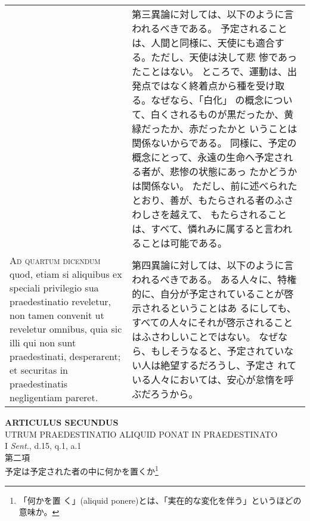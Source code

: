 \documentclass[10pt]{jsarticle} %
\begin{document}
\begin{longtable}{p{21em}p{21em}}
 
&

第三異論に対しては、以下のように言われるべきである。
予定されることは、人間と同様に、天使にも適合する。ただし、天使は決して悲
 惨であったことはない。
ところで、運動は、出発点ではなく終着点から種を受け取る。なぜなら、「白化」
 の概念について、白くされるものが黒だったか、黄緑だったか、赤だったかと
 いうことは関係ないからである。
同様に、予定の概念にとって、永遠の生命へ予定される者が、悲惨の状態にあっ
 たかどうかは関係ない。
ただし、前に述べられたとおり、善が、もたらされる者のふさわしさを越えて、
もたらされることは、すべて、憐れみに属すると言われることは可能である。



\\


{\scshape Ad quartum dicendum} quod, etiam si aliquibus
ex speciali privilegio sua praedestinatio reveletur, non tamen convenit
ut reveletur omnibus, quia sic illi qui non sunt praedestinati,
desperarent; et securitas in praedestinatis negligentiam pareret.

 
&

第四異論に対しては、以下のように言われるべきである。
ある人々に、特権的に、自分が予定されていることが啓示されるということはあ
 るにしても、すべての人々にそれが啓示されることはふさわしいことではない。
 なぜなら、もしそうなると、予定されていない人は絶望するだろうし、予定さ
 れている人々においては、安心が怠惰を呼ぶだろうから。



\end{longtable}
\newpage

\begin{center}
 {\Large {\bf ARTICULUS SECUNDUS}}\\
 {\large UTRUM PRAEDESTINATIO ALIQUID PONAT IN PRAEDESTINATO}\\
 {\footnotesize I {\itshape Sent.}, d.15, q.1, a.1}\\
 {\Large 第二項\\予定は予定された者の中に何かを置くか\footnote{「何かを置
 く」(aliquid ponere)とは、「実在的な変化を伴う」というほどの意味か。}}
\end{center}
\end{document}
